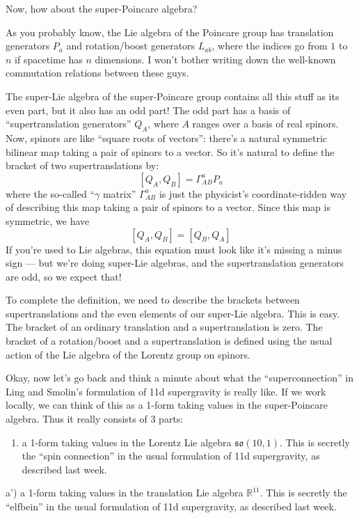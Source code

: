 \documentclass{article}
\def\tightlist{}
\begin{document}
Now, how about the super-Poincare algebra?

As you probably know, the Lie algebra of the Poincare group has
translation generators \(P_a\) and rotation/boost generators \(L_{ab}\),
where the indices go from \(1\) to \(n\) if spacetime has \(n\)
dimensions. I won't bother writing down the well-known commutation
relations between these guys.

The super-Lie algebra of the super-Poincare group contains all this
stuff as its even part, but it also has an odd part! The odd part has a
basis of ``supertranslation generators'' \(Q_A\), where \(A\) ranges
over a basis of real spinors. Now, spinors are like ``square roots of
vectors'': there's a natural symmetric bilinear map taking a pair of
spinors to a vector. So it's natural to define the bracket of two
supertranslations by: \[[Q_A,Q_B] = \Gamma_{AB}^a P_a\] where the
so-called ``\(\gamma\) matrix'' \(\Gamma_{AB}^a\) is just the
physicist's coordinate-ridden way of describing this map taking a pair
of spinors to a vector. Since this map is symmetric, we have
\[[Q_A,Q_B] = [Q_B,Q_A]\] If you're used to Lie algebras, this equation
must look like it's missing a minus sign --- but we're doing super-Lie
algebras, and the supertranslation generators are odd, so we expect
that!

To complete the definition, we need to describe the brackets between
supertranslations and the even elements of our super-Lie algebra. This
is easy. The bracket of an ordinary translation and a supertranslation
is zero. The bracket of a rotation/boost and a supertranslation is
defined using the usual action of the Lie algebra of the Lorentz group
on spinors.

Okay, now let's go back and think a minute about what the
``superconnection'' in Ling and Smolin's formulation of 11d supergravity
is really like. If we work locally, we can think of this as a 1-form
taking values in the super-Poincare algebra. Thus it really consists of
3 parts:

\begin{enumerate}
\def\labelenumi{\alph{enumi})}
\tightlist
\item
  a 1-form taking values in the Lorentz Lie algebra
  \(\mathfrak{so}(10,1)\). This is secretly the ``spin connection'' in
  the usual formulation of 11d supergravity, as described last week.
\end{enumerate}

a') a 1-form taking values in the translation Lie algebra
\(\mathbb{R}^{11}\). This is secretly the ``elfbein'' in the usual
formulation of 11d supergravity, as described last week.
\end{document}
